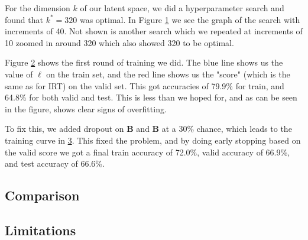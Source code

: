 \documentclass[twocolumn]{article}
\begin{document}
\begin{figure}[!ht]
    \centering
    
    \label{fig:kstar}
\end{figure}

For the dimension $k$ of our latent space, we did a hyperparameter search and
found that $k^* = 320$ was optimal. In Figure \ref{fig:kstar} we see the graph
of the search with increments of 40. Not shown is another search which we
repeated at increments of 10 zoomed in around 320 which also showed 320 to be
optimal.

\begin{figure}[!ht]
    \centering
    
    \label{fig:predropout}
\end{figure}

Figure \ref{fig:predropout} shows the first round of training we did. The blue
line shows us the value of $\ell$ on the train set, and the red line shows us
the "score" (which is the same as for IRT) on the valid set. This got
accuracies of 79.9\% for train, and 64.8\% for both valid and test. This is
less than we hoped for, and as can be seen in the figure, shows clear signs of
overfitting.

\begin{figure}[!ht]
    \centering
    
    \label{fig:withdropout}
\end{figure}

To fix this, we added dropout on $\mathbf{B}$ and $\mathbf{B}$ at a 30\%
chance, which leads to the training curve in \ref{fig:withdropout}. This fixed
the problem, and by doing early stopping based on the valid score we got a
final train accuracy of 72.0\%, valid accuracy of 66.9\%, and test accuracy of
66.6\%.

\subsection{Comparison}

\subsection{Limitations}
\end{document}
